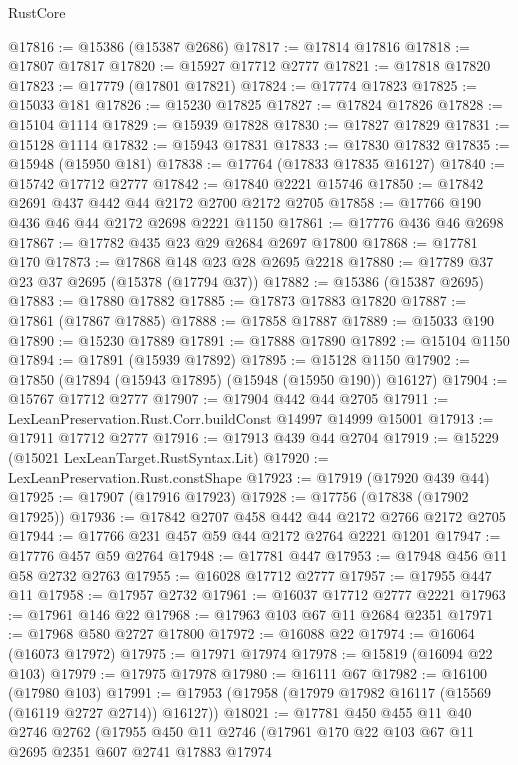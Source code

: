 \begin{lexlean}{RustCore}
\begin{coremodule}
@17816 := @15386 (@15387 @2686)
@17817 := @17814 @17816
@17818 := @17807 @17817
@17820 := @15927 @17712 @2777
@17821 := @17818 @17820
@17823 := @17779 (@17801 @17821)
@17824 := @17774 @17823
@17825 := @15033 @181
@17826 := @15230 @17825
@17827 := @17824 @17826
@17828 := @15104 @1114
@17829 := @15939 @17828
@17830 := @17827 @17829
@17831 := @15128 @1114
@17832 := @15943 @17831
@17833 := @17830 @17832
@17835 := @15948 (@15950 @181)
@17838 := @17764 (@17833 @17835 @16127)
@17840 := @15742 @17712 @2777
@17842 := @17840 @2221 @15746
@17850 := @17842 @2691 @437 @442 @44 @2172 @2700 @2172 @2705
@17858 := @17766 @190 @436 @46 @44 @2172 @2698 @2221 @1150
@17861 := @17776 @436 @46 @2698
@17867 := @17782 @435 @23 @29 @2684 @2697 @17800
@17868 := @17781 @170
@17873 := @17868 @148 @23 @28 @2695 @2218
@17880 := @17789 @37 @23 @37 @2695 (@15378 (@17794 @37))
@17882 := @15386 (@15387 @2695)
@17883 := @17880 @17882
@17885 := @17873 @17883 @17820
@17887 := @17861 (@17867 @17885)
@17888 := @17858 @17887
@17889 := @15033 @190
@17890 := @15230 @17889
@17891 := @17888 @17890
@17892 := @15104 @1150
@17894 := @17891 (@15939 @17892)
@17895 := @15128 @1150
@17902 := @17850 (@17894 (@15943 @17895) (@15948 (@15950 @190)) @16127)
@17904 := @15767 @17712 @2777
@17907 := @17904 @442 @44 @2705
@17911 := LexLeanPreservation.Rust.Corr.buildConst @14997 @14999 @15001
@17913 := @17911 @17712 @2777
@17916 := @17913 @439 @44 @2704
@17919 := @15229 (@15021 LexLeanTarget.RustSyntax.Lit)
@17920 := LexLeanPreservation.Rust.constShape
@17923 := @17919 (@17920 @439 @44)
@17925 := @17907 (@17916 @17923)
@17928 := @17756 (@17838 (@17902 @17925))
@17936 := @17842 @2707 @458 @442 @44 @2172 @2766 @2172 @2705
@17944 := @17766 @231 @457 @59 @44 @2172 @2764 @2221 @1201
@17947 := @17776 @457 @59 @2764
@17948 := @17781 @447
@17953 := @17948 @456 @11 @58 @2732 @2763
@17955 := @16028 @17712 @2777
@17957 := @17955 @447 @11
@17958 := @17957 @2732
@17961 := @16037 @17712 @2777 @2221
@17963 := @17961 @146 @22
@17968 := @17963 @103 @67 @11 @2684 @2351
@17971 := @17968 @580 @2727 @17800
@17972 := @16088 @22
@17974 := @16064 (@16073 @17972)
@17975 := @17971 @17974
@17978 := @15819 (@16094 @22 @103)
@17979 := @17975 @17978
@17980 := @16111 @67
@17982 := @16100 (@17980 @103)
@17991 := @17953 (@17958 (@17979 @17982 @16117 (@15569 (@16119 @2727 @2714)) @16127))
@18021 := @17781
    @450
    @455
    @11
    @40
    @2746
    @2762
    (@17955
      @450
      @11
      @2746
      (@17961
        @170
        @22
        @103
        @67
        @11
        @2695
        @2351
        @607
        @2741
        @17883
        @17974

\end{coremodule}
\end{lexlean}
